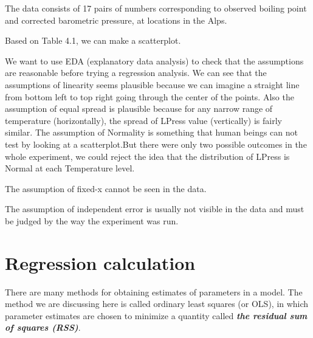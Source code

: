 \documentclass{article}
\begin{document}
    The data consists of 17 pairs of numbers corresponding to observed boiling point and corrected barometric pressure, at locations in the Alps.
    
    Based on Table 4.1, we can make a scatterplot.
    
    \begin{center}
    \end{center}
    
    We want to use EDA (explanatory data analysis)  to check that the assumptions are reasonable before trying a regression analysis. We can see that the assumptions of linearity seems plausible because we can imagine a straight line from bottom left to top right going through the center of the points. Also the assumption of equal spread is plausible because for any narrow range of temperature (horizontally), the spread of LPress value (vertically) is fairly similar. The assumption of Normality is something that human beings can not test by looking at a scatterplot.But there were only two possible outcomes in the whole experiment, we could reject the idea that the distribution of LPress is Normal at each Temperature level.
    
    The assumption of fixed-x cannot be seen in the data.
    
    The assumption of independent error is usually not visible in the data and
must be judged by the way the experiment was run.

\section{Regression calculation} 
    There are many methods for obtaining estimates of parameters in a model. The method we are discussing here is called ordinary least squares (or OLS), in which parameter estimates are chosen to minimize a quantity called \textit{\textbf{the residual sum of squares (RSS)}}.
    
\end{document}
